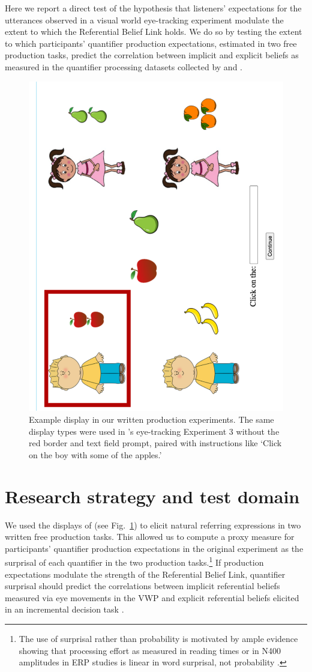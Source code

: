 \documentclass[10pt,letterpaper]{article}
\newcommand{\figref}[1]{Fig.~\ref{#1}}
\begin{document}
Here we report a direct test of the hypothesis that listeners' expectations for the utterances observed in a visual world eye-tracking  experiment modulate the extent to which the Referential Belief Link holds. We do so by testing the extent to which participants' quantifier production expectations, estimated in two free production tasks, predict the correlation between implicit and explicit beliefs as measured in the quantifier processing datasets collected by  and .






\begin{figure}[h]
\centering
\includegraphics[width=.35\textwidth,angle=270]{images/instructionImage}
\caption{Example display in our written production experiments. The same display types were used in 's eye-tracking Experiment 3 without the red border and text field prompt, paired with instructions like `Click on the boy with some of the apples.'}
\label{fig:display}
\end{figure}

\section{Research strategy and test domain}

We used the displays of  (see \figref{fig:display}) to elicit natural referring expressions in two written free production tasks. This allowed us to compute a proxy measure for participants' quantifier production expectations in the original experiment as   the surprisal of each quantifier in the two production tasks.\footnote{The use of surprisal rather than probability is motivated by ample evidence showing that processing effort as measured in reading times or in N400 amplitudes in ERP studies is linear in word surprisal, not  probability \cite{levy2008,smithlevy2013,frank2013word}.}
If production expectations modulate the strength of the Referential Belief Link, quantifier surprisal should predict the correlations between implicit referential beliefs measured via eye movements in the VWP \cite{sun2020} and  explicit referential beliefs elicited in an incremental decision task \cite{DegenEtAl2021}.
\end{document}
